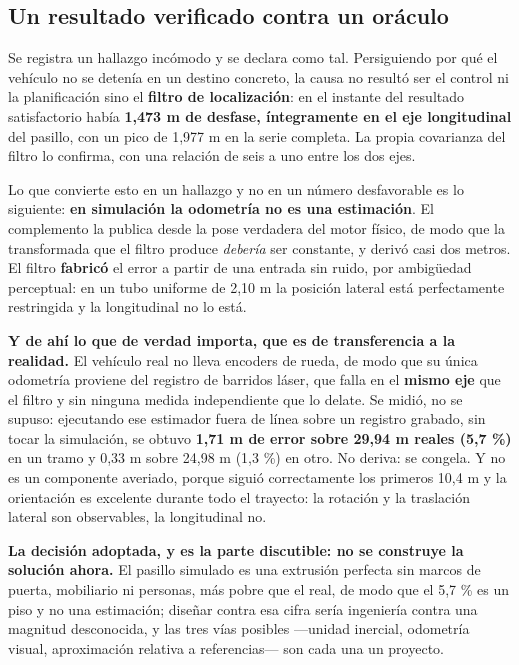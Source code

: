 \documentclass[12pt,letterpaper]{article}
\begin{document}
\subsection{Un resultado verificado contra un oráculo}

Se registra un hallazgo incómodo y se declara como tal. Persiguiendo por qué el vehículo no se detenía en un destino concreto, la causa no resultó ser el control ni la planificación sino el \textbf{filtro de localización}: en el instante del resultado satisfactorio había \textbf{1,473 m de desfase, íntegramente en el eje longitudinal} del pasillo, con un pico de 1,977 m en la serie completa. La propia covarianza del filtro lo confirma, con una relación de seis a uno entre los dos ejes.

Lo que convierte esto en un hallazgo y no en un número desfavorable es lo siguiente: \textbf{en simulación la odometría no es una estimación}. El complemento la publica desde la pose verdadera del motor físico, de modo que la transformada que el filtro produce \emph{debería} ser constante, y derivó casi dos metros. El filtro \textbf{fabricó} el error a partir de una entrada sin ruido, por ambigüedad perceptual: en un tubo uniforme de 2,10 m la posición lateral está perfectamente restringida y la longitudinal no lo está.

\textbf{Y de ahí lo que de verdad importa, que es de transferencia a la realidad.} El vehículo real no lleva encoders de rueda, de modo que su única odometría proviene del registro de barridos láser, que falla en el \textbf{mismo eje} que el filtro y sin ninguna medida independiente que lo delate. Se midió, no se supuso: ejecutando ese estimador fuera de línea sobre un registro grabado, sin tocar la simulación, se obtuvo \textbf{1,71 m de error sobre 29,94 m reales (5,7 \%)} en un tramo y 0,33 m sobre 24,98 m (1,3 \%) en otro. No deriva: se congela. Y no es un componente averiado, porque siguió correctamente los primeros 10,4 m y la orientación es excelente durante todo el trayecto: la rotación y la traslación lateral son observables, la longitudinal no.

\textbf{La decisión adoptada, y es la parte discutible: no se construye la solución ahora.} El pasillo simulado es una extrusión perfecta sin marcos de puerta, mobiliario ni personas, más pobre que el real, de modo que el 5,7 \% es un piso y no una estimación; diseñar contra esa cifra sería ingeniería contra una magnitud desconocida, y las tres vías posibles ---unidad inercial, odometría visual, aproximación relativa a referencias--- son cada una un proyecto.
\end{document}
